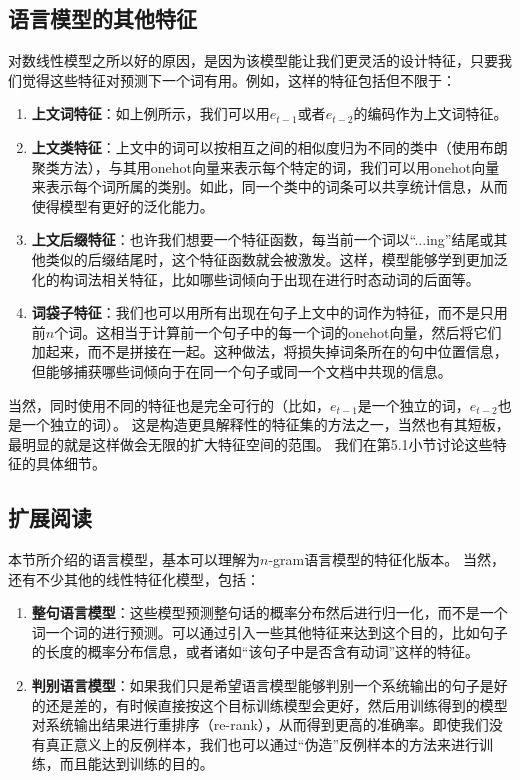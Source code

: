 \documentclass[10pt,a4paper]{ctexart}
\begin{document}
\subsection{语言模型的其他特征}
对数线性模型之所以好的原因，是因为该模型能让我们更灵活的设计特征，只要我们觉得这些特征对预测下一个词有用。例如，这样的特征包括但不限于：
\begin{enumerate}
\item[] \textbf{上文词特征}：如上例所示，我们可以用$e_{t-1}$或者$e_{t-2}$的编码作为上文词特征。
\item[] \textbf{上文类特征}：上文中的词可以按相互之间的相似度归为不同的类中（使用布朗聚类方法\cite{brown1992class}），与其用onehot向量来表示每个特定的词，我们可以用onehot向量来表示每个词所属的类别\cite{chen2009shrinking}。如此，同一个类中的词条可以共享统计信息，从而使得模型有更好的泛化能力。
\item[] \textbf{上文后缀特征}：也许我们想要一个特征函数，每当前一个词以“...ing”结尾或其他类似的后缀结尾时，这个特征函数就会被激发。这样，模型能够学到更加泛化的构词法相关特征，比如哪些词倾向于出现在进行时态动词的后面等。
\item[] \textbf{词袋子特征}：我们也可以用所有出现在句子上文中的词作为特征，而不是只用前$n$个词。这相当于计算前一个句子中的每一个词的onehot向量，然后将它们加起来，而不是拼接在一起。这种做法，将损失掉词条所在的句中位置信息，但能够捕获哪些词倾向于在同一个句子或同一个文档中共现的信息。
\end{enumerate}

当然，同时使用不同的特征也是完全可行的（比如，$e_{t-1}$是一个独立的词，$e_{t-2}$也是一个独立的词）。
这是构造更具解释性的特征集的方法之一，当然也有其短板，最明显的就是这样做会无限的扩大特征空间的范围。
我们在第5.1小节讨论这些特征的具体细节。

\subsection{扩展阅读}
本节所介绍的语言模型，基本可以理解为$n$-gram语言模型的特征化版本。
当然，还有不少其他的线性特征化模型，包括：
\begin{enumerate}
\item[] \textbf{整句语言模型}：这些模型预测整句话的概率分布然后进行归一化\cite{rosenfeld2001whole}，而不是一个词一个词的进行预测。可以通过引入一些其他特征来达到这个目的，比如句子的长度的概率分布信息，或者诸如“该句子中是否含有动词”这样的特征。
\item[] \textbf{判别语言模型}：如果我们只是希望语言模型能够判别一个系统输出的句子是好的还是差的，有时候直接按这个目标训练模型会更好，然后用训练得到的模型对系统输出结果进行重排序（re-rank），从而得到更高的准确率\cite{roark2004discriminative}。即使我们没有真正意义上的反例样本，我们也可以通过“伪造”反例样本的方法来进行训练，而且能达到训练的目的\cite{tsujiiythu2007discriminative}。
\end{enumerate}
\end{document}
